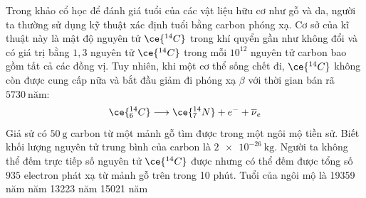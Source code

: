 \begin{ex}
	Trong khảo cổ học để đánh giá tuổi của các vật liệu hữu cơ như gỗ và da, người ta thường sử dụng kỹ thuật xác định tuổi bằng carbon phóng xạ. Cơ sở của kĩ thuật này là mật độ  nguyên tử $\ce{^{14}C}$ trong khí quyển gần như không đổi và có giá trị bằng $1,3$ nguyên tử $\ce{^{14}C}$ trong mỗi $10^{12}$ nguyên tử carbon bao gồm tất cả các đồng vị. Tuy nhiên, khi một cơ thể sống chết đi, $\ce{^{14}C}$ không còn được cung cấp nữa và bắt đầu giảm đi phóng xạ $\beta$ với thời gian bán rã $\SI{5730}{\text{năm}}$:
	$$\ce{^{14}_6C}\longrightarrow \ce{^{14}_7N}+e^{-}+\overline{\nu}_e$$
	Giả sử có $\SI{50}{\gram}$ carbon từ một mảnh gỗ tìm được trong một ngôi mộ tiền sử. Biết khối lượng nguyên tử trung bình của carbon là $\SI{2e-26}{\kilogram}$. Người ta không thể đếm trực tiếp số nguyên tử $\ce{^{14}C}$ được nhưng có thể đếm được tổng số $935$ electron phát xạ từ mảnh gỗ trên trong 10 phút. Tuổi của ngôi mộ là
	\choice
	{19359 năm}
	{ năm}
	{13223 năm}
	{15021 năm}
\end{ex}
